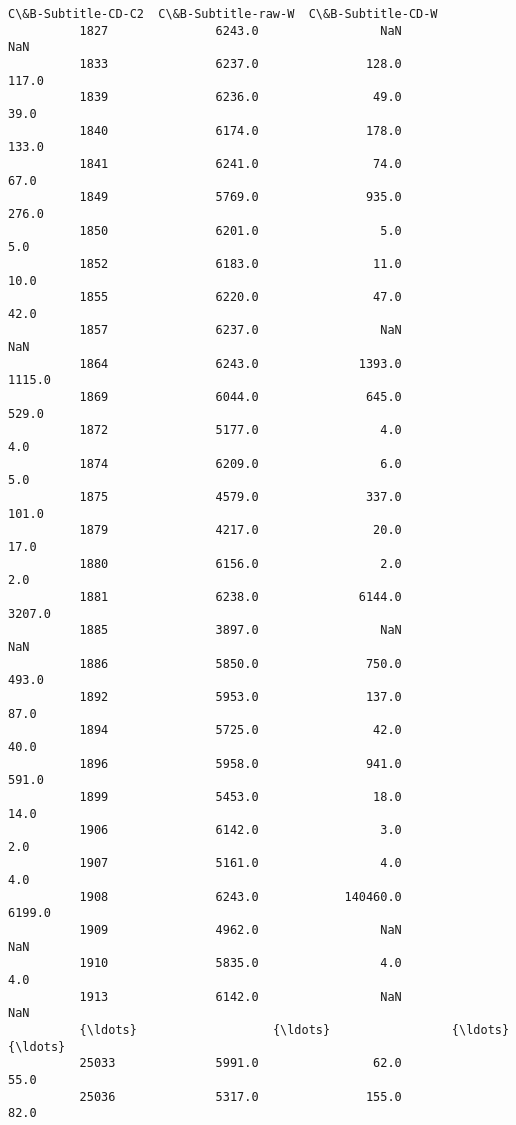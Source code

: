 \documentclass[11pt]{article}
\begin{document}
\begin{Verbatim}[commandchars=\\\{\}]
                 C\&B-Subtitle-CD-C2  C\&B-Subtitle-raw-W  C\&B-Subtitle-CD-W  
          1827               6243.0                 NaN                NaN  
          1833               6237.0               128.0              117.0  
          1839               6236.0                49.0               39.0  
          1840               6174.0               178.0              133.0  
          1841               6241.0                74.0               67.0  
          1849               5769.0               935.0              276.0  
          1850               6201.0                 5.0                5.0  
          1852               6183.0                11.0               10.0  
          1855               6220.0                47.0               42.0  
          1857               6237.0                 NaN                NaN  
          1864               6243.0              1393.0             1115.0  
          1869               6044.0               645.0              529.0  
          1872               5177.0                 4.0                4.0  
          1874               6209.0                 6.0                5.0  
          1875               4579.0               337.0              101.0  
          1879               4217.0                20.0               17.0  
          1880               6156.0                 2.0                2.0  
          1881               6238.0              6144.0             3207.0  
          1885               3897.0                 NaN                NaN  
          1886               5850.0               750.0              493.0  
          1892               5953.0               137.0               87.0  
          1894               5725.0                42.0               40.0  
          1896               5958.0               941.0              591.0  
          1899               5453.0                18.0               14.0  
          1906               6142.0                 3.0                2.0  
          1907               5161.0                 4.0                4.0  
          1908               6243.0            140460.0             6199.0  
          1909               4962.0                 NaN                NaN  
          1910               5835.0                 4.0                4.0  
          1913               6142.0                 NaN                NaN  
          {\ldots}                   {\ldots}                 {\ldots}                {\ldots}  
          25033              5991.0                62.0               55.0  
          25036              5317.0               155.0               82.0  

\end{Verbatim}
\end{document}
